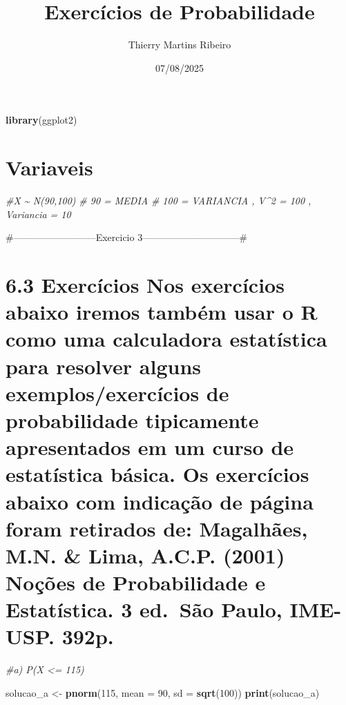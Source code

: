 \documentclass[
]{article}
\title{Exercícios de Probabilidade}
\author{Thierry Martins Ribeiro}
\date{07/08/2025}
\newenvironment{Shaded}{\begin{snugshade}}{\end{snugshade}}
\newcommand{\AttributeTok}[1]{\textcolor[rgb]{0.13,0.29,0.53}{#1}}
\newcommand{\CommentTok}[1]{\textcolor[rgb]{0.56,0.35,0.01}{\textit{#1}}}
\newcommand{\DecValTok}[1]{\textcolor[rgb]{0.00,0.00,0.81}{#1}}
\newcommand{\FunctionTok}[1]{\textcolor[rgb]{0.13,0.29,0.53}{\textbf{#1}}}
\newcommand{\NormalTok}[1]{#1}
\newcommand{\OtherTok}[1]{\textcolor[rgb]{0.56,0.35,0.01}{#1}}
\begin{document}
\maketitle

\begin{Shaded}
\begin{Highlighting}[]
\FunctionTok{library}\NormalTok{(ggplot2)}
\end{Highlighting}
\end{Shaded}

\section{Variaveis}\label{variaveis}

\begin{Shaded}
\begin{Highlighting}[]
\CommentTok{\#X \textasciitilde{} N(90,100) }
\CommentTok{\# 90 = MEDIA}
\CommentTok{\# 100 = VARIANCIA , V\^{}2 = 100 , Variancia = 10}
\end{Highlighting}
\end{Shaded}

\#--------------------------Exercicio 3------------------------------\#

\section{6.3 Exercícios Nos exercícios abaixo iremos também usar o R
como uma calculadora estatística para resolver alguns
exemplos/exercícios de probabilidade tipicamente apresentados em um
curso de estatística básica. Os exercícios abaixo com indicação de
página foram retirados de: Magalhães, M.N. \& Lima, A.C.P. (2001) Noções
de Probabilidade e Estatística. 3 ed.~São Paulo, IME-USP.
392p.}\label{exercuxedcios-nos-exercuxedcios-abaixo-iremos-tambuxe9m-usar-o-r-como-uma-calculadora-estatuxedstica-para-resolver-alguns-exemplosexercuxedcios-de-probabilidade-tipicamente-apresentados-em-um-curso-de-estatuxedstica-buxe1sica.-os-exercuxedcios-abaixo-com-indicauxe7uxe3o-de-puxe1gina-foram-retirados-de-magalhuxe3es-m.n.-lima-a.c.p.-2001-nouxe7uxf5es-de-probabilidade-e-estatuxedstica.-3-ed.-suxe3o-paulo-ime-usp.-392p.}

\begin{Shaded}
\begin{Highlighting}[]
\CommentTok{\#a) P(X \textless{}= 115)}

\NormalTok{solucao\_a }\OtherTok{\textless{}{-}} \FunctionTok{pnorm}\NormalTok{(}\DecValTok{115}\NormalTok{, }\AttributeTok{mean =} \DecValTok{90}\NormalTok{, }\AttributeTok{sd =} \FunctionTok{sqrt}\NormalTok{(}\DecValTok{100}\NormalTok{)) }
\FunctionTok{print}\NormalTok{(solucao\_a)}
\end{Highlighting}
\end{Shaded}
\end{document}
